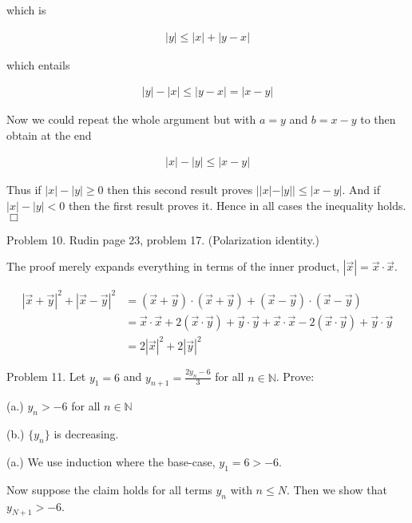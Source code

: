 \documentclass{article}
\begin{document}
which is

\begin{align*}
    |y| \leq |x|+|y-x|
\end{align*}

which entails

\begin{align*}
    |y|-|x| \leq |y-x| = |x-y|
\end{align*}

Now we could repeat the whole argument but with $a=y$ and $b=x-y$ to then obtain at the end

\begin{align*}
    |x|-|y| \leq |x-y|
\end{align*}

Thus if $|x|-|y| \geq 0$ then this second result proves $||x|-|y|| \leq |x-y|$.  And if $|x|-|y|<0$ then the first result proves it.  Hence in all cases the inequality holds. $\Box$

\pagebreak

{\Large \color{Sepia} Problem 10. Rudin page 23, problem 17.  (Polarization identity.)}

\vspace{1cm}

The proof merely expands everything in terms of the inner product, $|\vec x| = \vec x \cdot \vec x$.

\begin{align*}
    |\vec x + \vec y|^2 + |\vec x - \vec y|^2 &= (\vec x + \vec y)\cdot(\vec x + \vec y)+(\vec x - \vec y)\cdot(\vec x - \vec y) \\
    &= \vec x\cdot \vec x + 2(\vec x\cdot\vec y) + \vec y \cdot \vec y + \vec x \cdot \vec x -2(\vec x \cdot \vec y) + \vec y \cdot \vec y \\
    &= 2|\vec x|^2 + 2|\vec y|^2
\end{align*}

\pagebreak

{\Large \color{Sepia} Problem 11. Let $y_1=6$ and $y_{n+1}=\frac{2y_n-6}{3}$ for all $n\in\mathbb N$.  Prove:

(a.) $y_n > -6$ for all $n\in\mathbb N$

(b.) $\{y_n\}$ is decreasing.
}

\vspace{1cm}

(a.) We use induction where the base-case, $y_1=6>-6$.

Now suppose the claim holds for all terms $y_n$ with $n\leq N$.  Then we show that $y_{N+1}>-6$.
\end{document}
